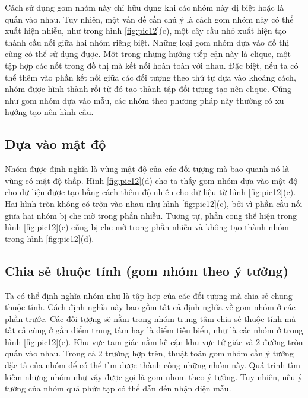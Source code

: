 Cách sử dụng gom nhóm này chỉ hữu dụng khi các nhóm này dị biệt hoặc là quấn vào nhau.
Tuy nhiên, một vấn đề cần chú ý là cách gom nhóm này có thể xuất hiện nhiễu, như trong hình \ref{fig:pic12}(c), một cây cầu nhỏ xuất hiện tạo thành cầu nối giữa hai nhóm riêng biệt.
Những loại gom nhóm dựa vào đồ thị cũng có thể sử dụng được.
Một trong những hướng tiếp cận này là clique, một tập hợp các nốt trong đồ thị mà kết nối hoàn toàn với nhau.
Đặc biệt, nếu ta có thể thêm vào phần kết nối giữa các đối tượng theo thứ tự dựa vào khoảng cách, nhóm được hình thành rồi từ đó tạo thành tập đối tượng tạo nên clique.
Cũng như gom nhóm dựa vào mẫu, các nhóm theo phương pháp này thường có xu hướng tạo nên hình cầu.

\subsection{Dựa vào mật độ}
Nhóm được định nghĩa là vùng mật độ của các đối tượng mà bao quanh nó là vùng có mật độ thấp.
Hình \ref{fig:pic12}(d) cho ta thấy gom nhóm dựa vào mật độ cho dữ liệu được tạo bằng cách thêm độ nhiễu cho dữ liệu từ hình \ref{fig:pic12}(c).
Hai hình tròn không có trộn vào nhau như hình \ref{fig:pic12}(c), bởi vì phần cầu nối giữa hai nhóm bị che mờ trong phần nhiễu.
Tương tự, phần cong thể hiện trong hình \ref{fig:pic12}(c) cũng bị che mờ trong phần nhiễu và không tạo thành nhóm trong hình \ref{fig:pic12}(d).

\subsection{Chia sẻ thuộc tính (gom nhóm theo ý tưởng)}
Ta có thể định nghĩa nhóm như là tập hợp của các đối tượng mà chia sẻ chung thuộc tính.
Cách định nghĩa này bao gồm tất cả định nghĩa về gom nhóm ở các phần trước.
Các đối tượng sẽ nằm trong nhóm trung tâm chia sẻ thuộc tính mà tất cả cùng ở gần điểm trung tâm hay là điểm tiêu biểu, như là các nhóm ở trong hình \ref{fig:pic12}(e).
Khu vực tam giác nằm kế cận khu vực tứ giác và 2 đường tròn quấn vào nhau.
Trong cả 2 trường hợp trên, thuật toán gom nhóm cần ý tưởng đặc tả của nhóm để có thể tìm được thành công những nhóm này.
Quá trình tìm kiếm những nhóm như vậy được gọi là gom nhom theo ý tưởng.
Tuy nhiên, nếu ý tưởng của nhóm quá phức tạp có thể dẫn đến nhận diện mẫu.

